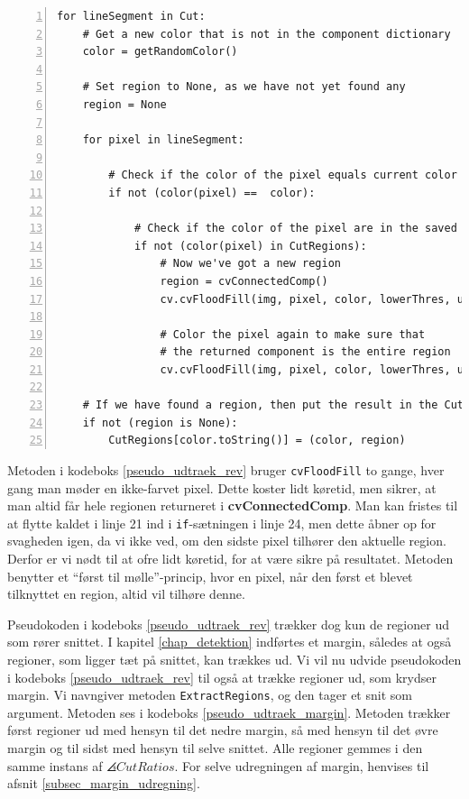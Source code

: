 {\begin{lstlisting}[caption={Revideret pseudokode til udtrækning af
    regioner. Returnerer ingen
    duplikater.},captionpos=b,label={pseudo_udtraek_rev},numbers=left,
    frame=single, breaklines=false, float=p]
for lineSegment in Cut:
    # Get a new color that is not in the component dictionary
    color = getRandomColor()

    # Set region to None, as we have not yet found any
    region = None

    for pixel in lineSegment:

        # Check if the color of the pixel equals current color
        if not (color(pixel) ==  color):

            # Check if the color of the pixel are in the saved regions
            if not (color(pixel) in CutRegions):
                # Now we've got a new region
                region = cvConnectedComp()
                cv.cvFloodFill(img, pixel, color, lowerThres, upperThres, region)

                # Color the pixel again to make sure that
                # the returned component is the entire region
                cv.cvFloodFill(img, pixel, color, lowerThres, upperThres, region)

    # If we have found a region, then put the result in the CutRegions-dictionary
    if not (region is None):
        CutRegions[color.toString()] = (color, region)
\end{lstlisting}

Metoden i kodeboks \ref{pseudo_udtraek_rev} bruger \texttt{cvFloodFill}
to gange, hver gang man møder en ikke-farvet pixel. Dette koster lidt
køretid, men sikrer, at man altid får hele regionen returneret i
\textbf{cvConnectedComp}. Man kan fristes til at flytte kaldet i linje
21 ind i \texttt{if}-sætningen i linje 24, men dette åbner op for
svagheden igen, da vi ikke ved, om den sidste pixel tilhører den
aktuelle region. Derfor er vi nødt til at ofre lidt køretid, for at
være sikre på resultatet. Metoden benytter et ``først til
mølle''-princip, hvor en pixel, når den først et blevet tilknyttet en
region, altid vil tilhøre denne.

Pseudokoden i kodeboks \ref{pseudo_udtraek_rev} trækker dog kun de
regioner ud som rører snittet. I kapitel \ref{chap_detektion} indførtes
et margin, således at også regioner, som ligger tæt på snittet, kan
trækkes ud. Vi vil nu udvide pseudokoden i kodeboks
\ref{pseudo_udtraek_rev} til også at trække regioner ud, som krydser
margin. Vi navngiver metoden \texttt{ExtractRegions}, og den tager et
snit som argument. Metoden ses i kodeboks
\ref{pseudo_udtraek_margin}. Metoden trækker først regioner ud med
hensyn til det nedre margin, så med hensyn til det øvre margin og til
sidst med hensyn til selve snittet. Alle regioner gemmes i den samme
instans af $\angles{CutRatios}$. For selve udregningen af margin,
henvises til afsnit \ref{subsec_margin_udregning}.

}
